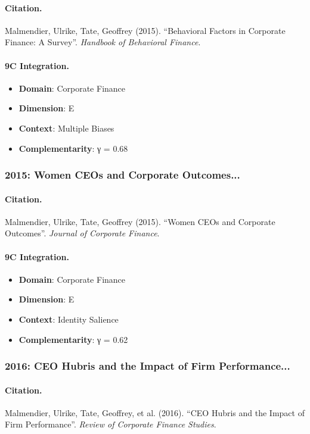 \paragraph{Citation.}
Malmendier, Ulrike, Tate, Geoffrey (2015). ``Behavioral Factors in Corporate Finance: A Survey''. \textit{Handbook of Behavioral Finance}.

\paragraph{9C Integration.}
\begin{itemize}[nosep]
  \item \textbf{Domain}: Corporate Finance
  \item \textbf{Dimension}: E
  \item \textbf{Context}: Multiple Biases
  \item \textbf{Complementarity}: γ = 0.68
\end{itemize}


\subsubsection{2015: Women CEOs and Corporate Outcomes...}

\paragraph{Citation.}
Malmendier, Ulrike, Tate, Geoffrey (2015). ``Women CEOs and Corporate Outcomes''. \textit{Journal of Corporate Finance}.

\paragraph{9C Integration.}
\begin{itemize}[nosep]
  \item \textbf{Domain}: Corporate Finance
  \item \textbf{Dimension}: E
  \item \textbf{Context}: Identity Salience
  \item \textbf{Complementarity}: γ = 0.62
\end{itemize}


\subsubsection{2016: CEO Hubris and the Impact of Firm Performance...}

\paragraph{Citation.}
Malmendier, Ulrike, Tate, Geoffrey, et al. (2016). ``CEO Hubris and the Impact of Firm Performance''. \textit{Review of Corporate Finance Studies}.

